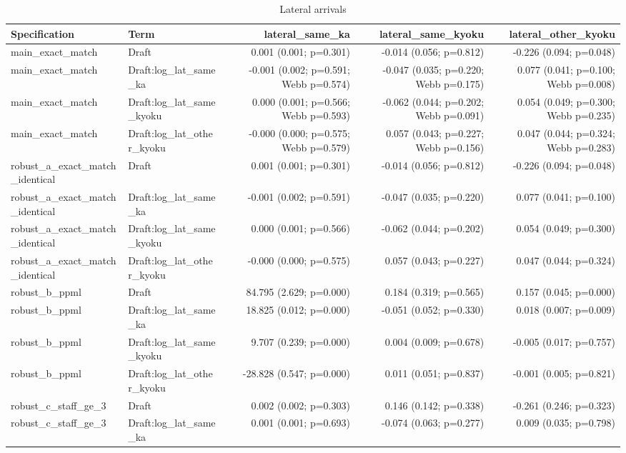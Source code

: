 \begin{table}[!htbp]
\centering
\caption{Lateral arrivals}
\begin{tabular}{llrrr}
\hline
Specification & Term & lateral_same_ka & lateral_same_kyoku & lateral_other_kyoku
\\
\hline
main_exact_match & Draft & 0.001 (0.001; p=0.301) & -0.014 (0.056; p=0.812) & -0.226 (0.094; p=0.048)
\\
main_exact_match & Draft:log_lat_same_ka & -0.001 (0.002; p=0.591; Webb p=0.574) & -0.047 (0.035; p=0.220; Webb p=0.175) & 0.077 (0.041; p=0.100; Webb p=0.008)
\\
main_exact_match & Draft:log_lat_same_kyoku & 0.000 (0.001; p=0.566; Webb p=0.593) & -0.062 (0.044; p=0.202; Webb p=0.091) & 0.054 (0.049; p=0.300; Webb p=0.235)
\\
main_exact_match & Draft:log_lat_other_kyoku & -0.000 (0.000; p=0.575; Webb p=0.579) & 0.057 (0.043; p=0.227; Webb p=0.156) & 0.047 (0.044; p=0.324; Webb p=0.283)
\\
robust_a_exact_match_identical & Draft & 0.001 (0.001; p=0.301) & -0.014 (0.056; p=0.812) & -0.226 (0.094; p=0.048)
\\
robust_a_exact_match_identical & Draft:log_lat_same_ka & -0.001 (0.002; p=0.591) & -0.047 (0.035; p=0.220) & 0.077 (0.041; p=0.100)
\\
robust_a_exact_match_identical & Draft:log_lat_same_kyoku & 0.000 (0.001; p=0.566) & -0.062 (0.044; p=0.202) & 0.054 (0.049; p=0.300)
\\
robust_a_exact_match_identical & Draft:log_lat_other_kyoku & -0.000 (0.000; p=0.575) & 0.057 (0.043; p=0.227) & 0.047 (0.044; p=0.324)
\\
robust_b_ppml & Draft & 84.795 (2.629; p=0.000) & 0.184 (0.319; p=0.565) & 0.157 (0.045; p=0.000)
\\
robust_b_ppml & Draft:log_lat_same_ka & 18.825 (0.012; p=0.000) & -0.051 (0.052; p=0.330) & 0.018 (0.007; p=0.009)
\\
robust_b_ppml & Draft:log_lat_same_kyoku & 9.707 (0.239; p=0.000) & 0.004 (0.009; p=0.678) & -0.005 (0.017; p=0.757)
\\
robust_b_ppml & Draft:log_lat_other_kyoku & -28.828 (0.547; p=0.000) & 0.011 (0.051; p=0.837) & -0.001 (0.005; p=0.821)
\\
robust_c_staff_ge_3 & Draft & 0.002 (0.002; p=0.303) & 0.146 (0.142; p=0.338) & -0.261 (0.246; p=0.323)
\\
robust_c_staff_ge_3 & Draft:log_lat_same_ka & 0.001 (0.001; p=0.693) & -0.074 (0.063; p=0.277) & 0.009 (0.035; p=0.798)

\end{tabular}
\end{table}

